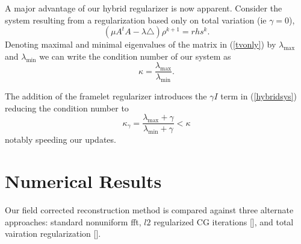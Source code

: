 \documentclass[11pt]{amsart}
\theoremstyle{remark}
\begin{document}
A major advantage of our hybrid regularizer is now apparent. Consider the system resulting from a regularization based only on total variation (ie $\gamma =0$),
\begin{equation}\label{tvonly}
(\mu A^tA - \lambda \triangle)\rho^{k+1} = rhs^k.
\end{equation}
Denoting maximal and minimal eigenvalues of the matrix in (\ref{tvonly}) by $\lambda_{\max}$ and $\lambda_{\min}$ we can write the condition number of our system as
\begin{equation}
\kappa = \frac{\lambda_{\max}}{\lambda_{\min}}.
\end{equation}

The addition of the framelet regularizer introduces the $\gamma I$ term in (\ref{hybridsys}) reducing the condition number to
\begin{equation}
\kappa_\gamma  =  \frac{\lambda_{\max} + \gamma}{\lambda_{\min} + \gamma} < \kappa
\end{equation}
notably speeding our updates.

\section{Numerical Results}

Our field corrected reconstruction method is compared against three alternate approaches: standard nonuniform fft, $l2$ regularized CG iterations [], and total vairation regularization [].








\end{document}
